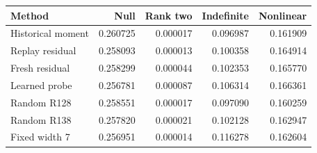 \begin{tabular}{lrrrr}
\toprule
Method & Null & Rank two & Indefinite & Nonlinear \\
\midrule
Historical moment & 0.260725 & 0.000017 & 0.096987 & 0.161909 \\
Replay residual & 0.258093 & 0.000013 & 0.100358 & 0.164914 \\
Fresh residual & 0.258299 & 0.000044 & 0.102353 & 0.165770 \\
Learned probe & 0.256781 & 0.000087 & 0.106314 & 0.166361 \\
Random R128 & 0.258551 & 0.000017 & 0.097090 & 0.160259 \\
Random R138 & 0.257820 & 0.000021 & 0.102128 & 0.162947 \\
Fixed width 7 & 0.256951 & 0.000014 & 0.116278 & 0.162604 \\
\bottomrule
\end{tabular}
